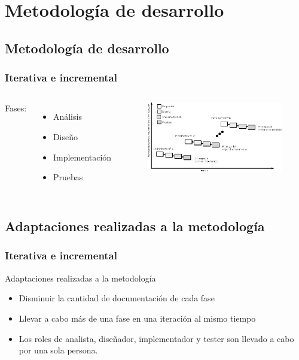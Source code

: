 \documentclass[9pt]{beamer}
\begin{document}
    \section{Metodología de desarrollo}
    \subsection{Metodología de desarrollo}
    \begin{frame}
        \frametitle{Iterativa e incremental}
              
        \begin{columns}
            Fases:
            \begin{itemize}
                \item Análisis
                \item Diseño
                \item Implementación
                \item Pruebas
            \end{itemize}
    
            \begin{figure}
                \includegraphics[width=\textwidth]{assets/iedevelopment-v2.eps}
            \end{figure}
        \end{columns}
    
    \end{frame}

    \subsection{Adaptaciones realizadas a la metodología}
    \begin{frame}
        \frametitle{Iterativa e incremental}            
        Adaptaciones realizadas a la metodología
        \begin{itemize}
            \item Disminuir la cantidad de documentación de cada fase
            \item Llevar a cabo más de una fase en una iteración al mismo tiempo
            \item Los roles de analista, diseñador, implementador y tester son llevado a cabo por una sola persona.
        \end{itemize}
    \end{frame}
\end{document}
